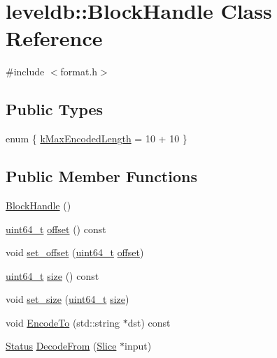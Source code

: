 \hypertarget{classleveldb_1_1_block_handle}{\section{leveldb\-:\-:Block\-Handle Class Reference}
\label{classleveldb_1_1_block_handle}
}


{\ttfamily \#include $<$format.\-h$>$}

\subsection*{Public Types}
\begin{DoxyCompactItemize}
\item 
enum \{ \hyperlink{classleveldb_1_1_block_handle_a8935e77f69f28c803c9b552d6304617faa75d972eb34f4e3618f95d045539dd09}{k\-Max\-Encoded\-Length} = 10 + 10
 \}
\end{DoxyCompactItemize}
\subsection*{Public Member Functions}
\begin{DoxyCompactItemize}
\item 
\hyperlink{classleveldb_1_1_block_handle_af2764f113b34af923ba196eb94cb2d09}{Block\-Handle} ()
\item 
\hyperlink{stdint_8h_aaa5d1cd013383c889537491c3cfd9aad}{uint64\-\_\-t} \hyperlink{classleveldb_1_1_block_handle_a31071c24f77e52a3bfc3a228f9f6c133}{offset} () const 
\item 
void \hyperlink{classleveldb_1_1_block_handle_ae6dad857a4f7f5e051762f874f0050bc}{set\-\_\-offset} (\hyperlink{stdint_8h_aaa5d1cd013383c889537491c3cfd9aad}{uint64\-\_\-t} \hyperlink{classleveldb_1_1_block_handle_a31071c24f77e52a3bfc3a228f9f6c133}{offset})
\item 
\hyperlink{stdint_8h_aaa5d1cd013383c889537491c3cfd9aad}{uint64\-\_\-t} \hyperlink{classleveldb_1_1_block_handle_a44931c9086cb3c30f767c751c3a7daec}{size} () const 
\item 
void \hyperlink{classleveldb_1_1_block_handle_a47a4169dce3026122b76d594453b78a8}{set\-\_\-size} (\hyperlink{stdint_8h_aaa5d1cd013383c889537491c3cfd9aad}{uint64\-\_\-t} \hyperlink{classleveldb_1_1_block_handle_a44931c9086cb3c30f767c751c3a7daec}{size})
\item 
void \hyperlink{classleveldb_1_1_block_handle_a71aa041d686d43e66ab570fce1ac388e}{Encode\-To} (std\-::string $\ast$dst) const 
\item 
\hyperlink{classleveldb_1_1_status}{Status} \hyperlink{classleveldb_1_1_block_handle_a1660fd202984d8d5bfa4bed6c5613621}{Decode\-From} (\hyperlink{classleveldb_1_1_slice}{Slice} $\ast$input)
\end{DoxyCompactItemize}
